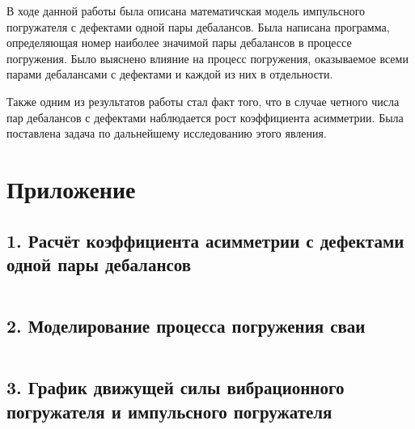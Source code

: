 В ходе данной работы была описана математичская модель импульсного погружателя с дефектами одной пары дебалансов. Была
написана программа, определяющая номер наиболее значимой пары дебалансов в процессе погружения. Было выяснено влияние на процесс погружения, оказываемое всеми парами дебалансами с дефектами и каждой из них в отдельности.

Также одним из результатов работы стал факт того, что в случае четного числа пар дебалансов с дефектами наблюдается
рост коэффициента асимметрии. Была поставлена задача по дальнейшему исследованию этого явления.

\clearpage


\nocite{*}

\printbibliography{}

\clearpage

\section*{Приложение}

\subsection*{1. Расчёт коэффициента асимметрии с дефектами одной пары дебалансов}
\inputminted[linenos, fontsize=\footnotesize]{python}{app/acoeff.py}

\subsection*{2. Моделирование процесса погружения сваи}
\inputminted[linenos, fontsize=\footnotesize]{python}{app/main.py}

\subsection*{3. График движущей силы вибрационного погружателя и импульсного погружателя}
\inputminted[linenos, fontsize=\footnotesize]{python}{app/impuls.py}
